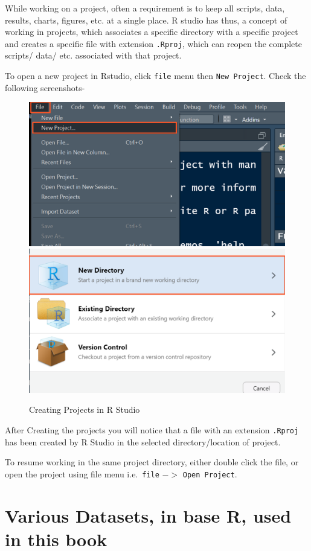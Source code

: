 \documentclass[
]{book}
\begin{document}
While working on a project, often a requirement is to keep all scripts, data, results, charts, figures, etc. at a single place. R studio has thus, a concept of working in projects, which associates a specific directory with a specific project and creates a specific file with extension \texttt{.Rproj}, which can reopen the complete scripts/ data/ etc. associated with that project.

To open a new project in Rstudio, click \texttt{file} menu then \texttt{New\ Project}. Check the following screenshots-

\begin{figure}

{\centering \includegraphics[width=0.49\linewidth,height=0.49\textheight]{images/Rproj1} \includegraphics[width=0.49\linewidth,height=0.49\textheight]{images/Rproj2} 

}

\caption{Creating Projects in R Studio}\label{fig:unnamed-chunk-468}
\end{figure}

After Creating the projects you will notice that a file with an extension \texttt{.Rproj} has been created by R Studio in the selected directory/location of project.

To resume working in the same project directory, either double click the file, or open the project using file menu i.e.~\texttt{file} \(->\) \texttt{Open\ Project}.

\hypertarget{various-datasets-in-base-r-used-in-this-book}{%
\chapter{Various Datasets, in base R, used in this book}\label{various-datasets-in-base-r-used-in-this-book}}
\end{document}
